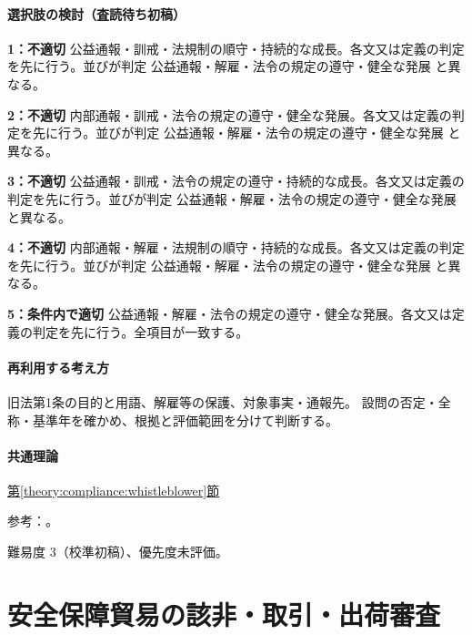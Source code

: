 \paragraph{選択肢の検討（査読待ち初稿）}\mbox{}\par

\noindent\textbf{1：不適切} 公益通報・訓戒・法規制の順守・持続的な成長。各文又は定義の判定を先に行う。並びが判定 公益通報・解雇・法令の規定の遵守・健全な発展 と異なる。\par

\noindent\textbf{2：不適切} 内部通報・訓戒・法令の規定の遵守・健全な発展。各文又は定義の判定を先に行う。並びが判定 公益通報・解雇・法令の規定の遵守・健全な発展 と異なる。\par

\noindent\textbf{3：不適切} 公益通報・訓戒・法令の規定の遵守・持続的な成長。各文又は定義の判定を先に行う。並びが判定 公益通報・解雇・法令の規定の遵守・健全な発展 と異なる。\par

\noindent\textbf{4：不適切} 内部通報・解雇・法規制の順守・持続的な成長。各文又は定義の判定を先に行う。並びが判定 公益通報・解雇・法令の規定の遵守・健全な発展 と異なる。\par

\noindent\textbf{5：条件内で適切} 公益通報・解雇・法令の規定の遵守・健全な発展。各文又は定義の判定を先に行う。全項目が一致する。\par

\paragraph{再利用する考え方} 旧法第1条の目的と用語、解雇等の保護、対象事実・通報先。 設問の否定・全称・基準年を確かめ、根拠と評価範囲を分けて判断する。

\paragraph{共通理論} \hyperref[theory:compliance:whistleblower]{第\ref*{theory:compliance:whistleblower}節}

\par 参考：\cite{caa_handbook_pre2022}。

\par 難易度 3（校準初稿）、優先度未評価。

\section{安全保障貿易の該非・取引・出荷審査}

